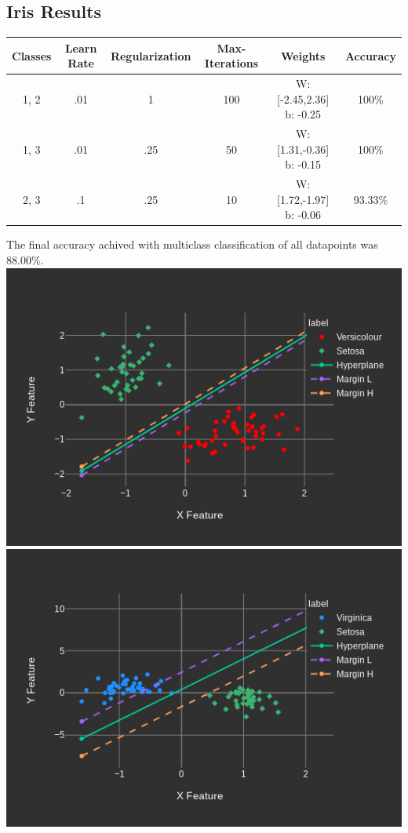 \documentclass[12pt]{article}%
\begin{document}
	\subsection{Iris Results}
	\begin{center}
		\begin{tabular}{||c c c c c c||} 
			\hline
			Classes & Learn Rate & Regularization & Max-Iterations & Weights & Accuracy\\ [0.5ex] 
			\hline\hline
			1, 2 & .01 & 1 & 100 & W: [-2.45,2.36] b: -0.25 & 100\% \\ 
			\hline
			1, 3 & .01 & .25 & 50 & W: [1.31,-0.36] b: -0.15 & 100\% \\
			\hline
			2, 3 & .1 & .25 & 10 & W: [1.72,-1.97] b: -0.06 & 93.33\% \\ [1ex] 
			\hline
		\end{tabular}
	\end{center}
	The final accuracy achived with multiclass classification of all datapoints was 88.00\%.\\
	\includegraphics[scale=.3]{./iris1.png}
	\includegraphics[scale=.3]{./iris2.png}
\end{document}
